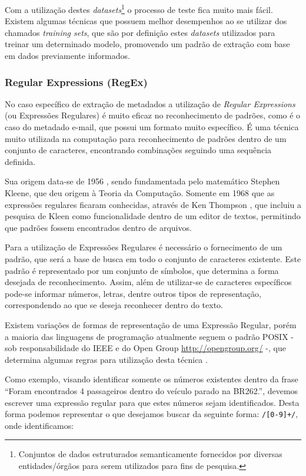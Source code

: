 Com a utilização destes \emph{datasets}\footnote{Conjuntos de dados estruturados semanticamente fornecidos por diversas entidades/órgãos para serem utilizados para fins de pesquisa.} o processo de teste fica muito mais fácil. Existem algumas técnicas que possuem melhor desempenhos ao se utilizar dos chamados \emph{training sets}, que são por definição estes \emph{datasets} utilizados para treinar um determinado modelo, promovendo um padrão de extração com base em dados previamente informados.

\subsubsection{Regular Expressions (RegEx)}
\label{sssec:regular-expressions}

No caso específico de extração de metadados a utilização de \emph{Regular Expressions} (ou Expressões Regulares) é muito eficaz no reconhecimento de padrões, como é o caso do metadado e-mail, que possui um formato muito específico. É uma técnica muito utilizada na computação para reconhecimento de padrões dentro de um conjunto de caracteres, encontrando combinações seguindo uma sequência definida.

Sua origem data-se de 1956 \cite{kleene-1956}, sendo fundamentada pelo matemático Stephen Kleene, que deu origem à Teoria da Computação. Somente em 1968 que as expressões regulares ficaram conhecidas, através de Ken Thompson \cite{thompson-1968}, que incluiu a pesquisa de Kleen como funcionalidade dentro de um editor de textos, permitindo que padrões fossem encontrados dentro de arquivos.

Para a utilização de Expressões Regulares é necessário o fornecimento de um padrão, que será a base de busca em todo o conjunto de caracteres existente. Este padrão é representado por um conjunto de símbolos, que determina a forma desejada de reconhecimento. Assim, além de utilizar-se de caracteres específicos pode-se informar números, letras, dentre outros tipos de representação, correspondendo ao que se deseja reconhecer dentro do texto.

Existem variações de formas de representação de uma Expressão Regular, porém a maioria das linguagens de programação atualmente seguem o padrão POSIX - sob responsabilidade do IEEE e do Open Group \url{http://opengroup.org/} -, que determina algumas regras para utilização desta técnica \cite{posix-2013}.

Como exemplo, visando identificar somente os números existentes dentro da frase ``Foram encontrados 4 passageiros dentro do veículo parado na BR262.'', devemos escrever uma expressão regular para que estes números sejam identificados. Desta forma podemos representar o que desejamos buscar da seguinte forma: \texttt{/[0-9]+/}, onde identificamos:

